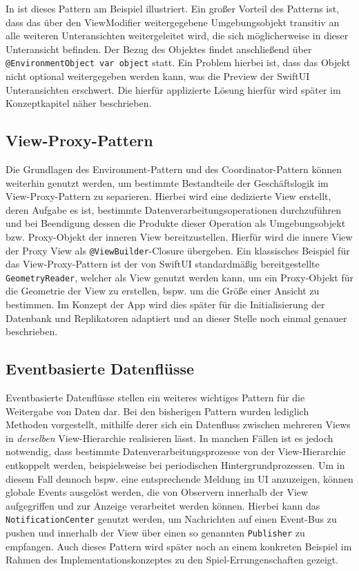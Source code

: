 \noindent In  ist dieses Pattern am Beispiel illustriert. Ein großer Vorteil des Patterns ist, dass das über den ViewModifier weitergegebene Umgebungsobjekt transitiv an alle weiteren Unteransichten weitergeleitet wird, die sich möglicherweise in dieser Unteransicht befinden. Der Bezug des Objektes findet anschließend über \texttt{@EnvironmentObject var object} statt. Ein Problem hierbei ist, dass das Objekt nicht optional weitergegeben werden kann, was die Preview der SwiftUI Unteransichten erschwert. Die hierfür applizierte Lösung hierfür wird später im Konzeptkapitel näher beschrieben.

\subsection{View-Proxy-Pattern}

Die Grundlagen des Environment-Pattern und des Coordinator-Pattern können weiterhin genutzt werden, um bestimmte Bestandteile der Geschäftslogik im View-Proxy-Pattern zu separieren. Hierbei wird eine dedizierte View erstellt, deren Aufgabe es ist, bestimmte Datenverarbeitungsoperationen durchzuführen und bei Beendigung dessen die Produkte dieser Operation als Umgebungsobjekt bzw. Proxy-Objekt der inneren View bereitzustellen. Hierfür wird die innere View der Proxy View als \texttt{@ViewBuilder}-Closure übergeben. Ein klassisches Beispiel für das View-Proxy-Pattern ist der von SwiftUI standardmäßig bereitgestellte \texttt{GeometryReader}, welcher als View genutzt werden kann, um ein Proxy-Objekt für die Geometrie der View zu erstellen, bspw. um die Größe einer Ansicht zu bestimmen. Im Konzept der App wird dies später für die Initialisierung der Datenbank und Replikatoren adaptiert und an dieser Stelle noch einmal genauer beschrieben.

\subsection{Eventbasierte Datenflüsse}

Eventbasierte Datenflüsse stellen ein weiteres wichtiges Pattern für die Weitergabe von Daten dar. Bei den bisherigen Pattern wurden lediglich Methoden vorgestellt, mithilfe derer sich ein Datenfluss zwischen mehreren Views in \textit{derselben} View-Hierarchie realisieren lässt. In manchen Fällen ist es jedoch notwendig, dass bestimmte Datenverarbeitungsprozesse von der View-Hierarchie entkoppelt werden, beispielsweise bei periodischen Hintergrundprozessen. Um in diesem Fall dennoch bspw. eine entsprechende Meldung im UI anzuzeigen, können globale Events ausgelöst werden, die von Observern innerhalb der View aufgegriffen und zur Anzeige verarbeitet werden können. Hierbei kann das \texttt{NotificationCenter} genutzt werden, um Nachrichten auf einen Event-Bus zu pushen und innerhalb der View über einen so genannten \texttt{Publisher} zu empfangen. Auch dieses Pattern wird später noch an einem konkreten Beispiel im Rahmen des Implementationskonzeptes zu den Spiel-Errungenschaften gezeigt.
